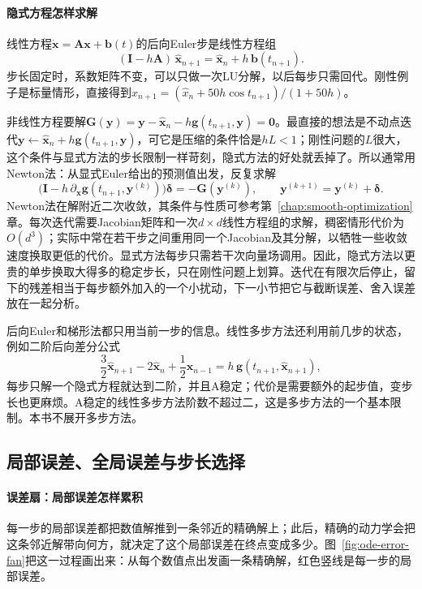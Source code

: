 \paragraph{隐式方程怎样求解}
线性方程$\dot{\bm x}=\bm A\bm x+\bm b(t)$的后向Euler步是线性方程组
\[
  (\bm I-h\bm A)\,\widehat{\bm x}_{n+1}=\widehat{\bm x}_n+h\,\bm b(t_{n+1}).
\]
步长固定时，系数矩阵不变，可以只做一次LU分解，以后每步只需回代。刚性例子是标量情形，直接得到$\widehat x_{n+1}=(\widehat x_n+50h\cos t_{n+1})/(1+50h)$。

非线性方程要解$\bm G(\bm y)=\bm y-\widehat{\bm x}_n-h\bm g(t_{n+1},\bm y)=\bm0$。最直接的想法是不动点迭代$\bm y\leftarrow\widehat{\bm x}_n+h\bm g(t_{n+1},\bm y)$，可它是压缩的条件恰是$hL<1$；刚性问题的$L$很大，这个条件与显式方法的步长限制一样苛刻，隐式方法的好处就丢掉了。所以通常用Newton法：从显式Euler给出的预测值出发，反复求解
\[
  \bigl(\bm I-h\,\partial_{\bm x}\bm g(t_{n+1},\bm y^{(k)})\bigr)\bm\delta=-\bm G(\bm y^{(k)}),\qquad\bm y^{(k+1)}=\bm y^{(k)}+\bm\delta.
\]
Newton法在解附近二次收敛，其条件与性质可参考第~\ref{chap:smooth-optimization}章。每次迭代需要Jacobian矩阵和一次$d\times d$线性方程组的求解，稠密情形代价为$O(d^3)$；实际中常在若干步之间重用同一个Jacobian及其分解，以牺牲一些收敛速度换取更低的代价。显式方法每步只需若干次向量场调用。因此，隐式方法以更贵的单步换取大得多的稳定步长，只在刚性问题上划算。迭代在有限次后停止，留下的残差相当于每步额外加入的一个小扰动，下一小节把它与截断误差、舍入误差放在一起分析。

后向Euler和梯形法都只用当前一步的信息。线性多步方法还利用前几步的状态，例如二阶后向差分公式
\[
  \frac32\widehat{\bm x}_{n+1}-2\widehat{\bm x}_n+\frac12\widehat{\bm x}_{n-1}=h\,\bm g(t_{n+1},\widehat{\bm x}_{n+1}),
\]
每步只解一个隐式方程就达到二阶，并且A稳定；代价是需要额外的起步值，变步长也更麻烦。A稳定的线性多步方法阶数不超过二，这是多步方法的一个基本限制。本书不展开多步方法。

\subsection{局部误差、全局误差与步长选择}
\label{sec:ode-error-step}

\paragraph{误差扇：局部误差怎样累积}
每一步的局部误差都把数值解推到一条邻近的精确解上；此后，精确的动力学会把这条邻近解带向何方，就决定了这个局部误差在终点变成多少。图~\ref{fig:ode-error-fan}把这一过程画出来：从每个数值点出发画一条精确解，红色竖线是每一步的局部误差。


